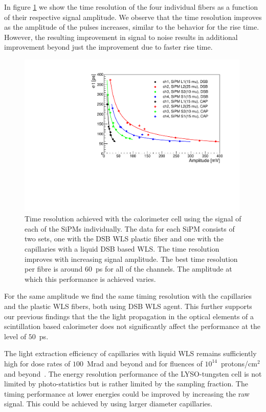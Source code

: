 In figure \ref{TimeResolution} we show the time resolution of the four
individual fibers as a function of their respective signal amplitude. We observe 
that the time resolution improves as the amplitude of the pulses increases, 
similar to the behavior for the rise time. However, the resulting improvement in 
signal to noise results in additional improvement beyond just the improvement due
to faster rise time. 

%
\begin{figure}[htb]
\includegraphics[width=0.99\textwidth]{figures/ShashlikTimeResolution.pdf}
\caption{\label{TimeResolution} Time resolution achieved with the calorimeter cell using the signal of each 
of the  SiPMs individually. The data for each SiPM consists of two sets, one with the DSB WLS plastic fiber and one with 
the capillaries with a liquid DSB based WLS. The time resolution improves with increasing signal amplitude. The best time 
resolution per fibre is around $60$~ps for all of the channels. The amplitude at which this performance is achieved varies.}
\end{figure}
%


For the same amplitude we find the same timing resolution with the capillaries
and the plastic WLS fibers, both using DSB WLS agent. This further supports our
previous findings that the the light propagation in the optical elements of a
scintillation based calorimeter does not significantly affect the performance at
the level of $50$~ps.

The light extraction efficiency of capillaries with liquid WLS remains
sufficiently high for dose rates of $100$~Mrad and beyond and for fluences of
$10^{14}$~protons/$\mathrm{cm}^{2}$ and beyond~\cite{shashlik2}. The
energy resolution performance of the LYSO-tungsten cell is not limited by
photo-statistics but is rather limited by the sampling fraction. The timing
performance at lower energies could be improved by increasing the raw signal.
This could be achieved by using larger diameter capillaries.\\ 

